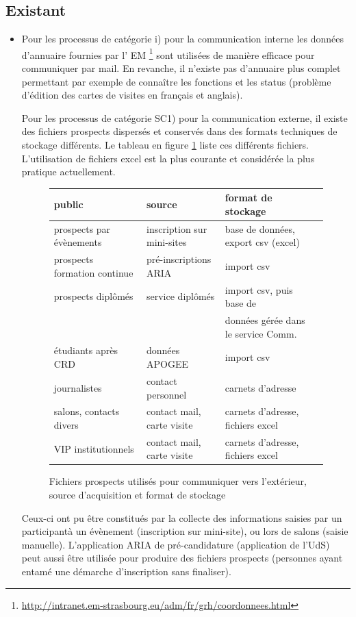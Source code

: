 \documentclass{book}
\begin{document}
\subsection{Existant}
\begin{itemize}
\item Pour les processus de catégorie i) pour la communication interne
	les données d'annuaire fournies par l' EM %
	\footnote{\url{http://intranet.em-strasbourg.eu/adm/fr/grh/coordonnees.html}}
	sont utilisées de manière efficace pour communiquer par mail.
	En revanche, il n'existe pas d'annuaire plus complet permettant
	par exemple de connaître les fonctions et les status (problème 
	d'édition des cartes de visites en français et anglais).


	Pour les processus de catégorie SC1) pour la communication externe,
	il existe des fichiers prospects dispersés et conservés dans des 
	formats techniques de stockage différents. Le tableau en figure 
	\ref{fg:comm_prospects} liste ces différents fichiers.
	L'utilisation de fichiers excel est la plus courante et considérée 
	la plus pratique actuellement.

\begin{figure}[hbt]
\begin{center}
	\begin{tabular}{llll}
	\hline
	\hline
	public	& source	 & format de stockage \\
	\hline
	prospects par évènements & inscription sur  mini-sites &  base de données, export csv (excel)\\
	prospects formation continue  & pré-inscriptions ARIA & import csv \\
	prospects diplômés      & service diplômés &  import csv, puis base de \\
					&			 &  données gérée dans le service Comm. \\
	étudiants après CRD 	& données APOGEE & import csv \\
	journalistes 		& contact personnel	& carnets d'adresse \\
	salons, contacts divers	& contact mail, carte visite & carnets d'adresse, fichiers excel\\ 
	VIP institutionnels	& contact mail, carte visite & carnets d'adresse, fichiers excel\\ 
	\hline
	\hline
	\end{tabular}
\end{center}
\caption{Fichiers prospects utilisés pour communiquer vers l'extérieur, source 
	d'acquisition et format de stockage}
\label{fg:comm_prospects}
\end{figure}
	Ceux-ci  ont pu être constitués par la collecte des informations saisies 
	par un participantà un évènement (inscription sur mini-site), ou lors de 
      salons (saisie manuelle). L'application ARIA de pré-candidature 
	(application de l'UdS) peut aussi être utilisée pour produire des 
	fichiers prospects (personnes ayant entamé une démarche d'inscription 
	sans finaliser).


\end{itemize}
\end{document}
